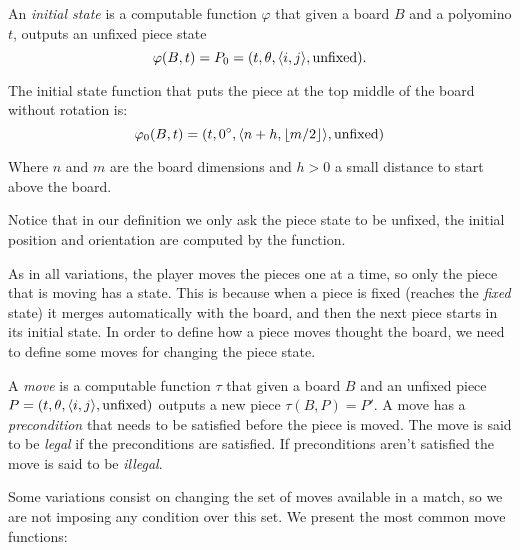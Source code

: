 \begin{definition} 
  An \emph{initial state} is a computable function $\varphi$ that given a board $B$ and a polyomino $t$, outputs an unfixed piece state $$\varphi(B,t) = P_0 = \piece[t][\theta][i][j][\text{unfixed}].$$
\end{definition}

\begin{example} The initial state function that puts the piece at the top middle of the board without rotation is:
$$\varphi_0(B,t) = \piece[t][0^\circ][n + h][\lfloor m / 2 \rfloor][\text{unfixed}]$$

Where $n$ and $m$ are the board dimensions and $h > 0$ a small distance to start above the board.

\end{example}


Notice that in our definition we only ask the piece state to be unfixed, the initial position and orientation are computed by the function. 

\vspace{10px}

As in all variations, the player moves the pieces one at a time, so only the piece that is moving has a state. This is because when a piece is fixed (reaches the \emph{fixed} state) it merges automatically with the board, and then the next piece starts in its initial state. In order to define how a piece moves thought the board, we need to define some moves for changing the piece state. 

\begin{definition} 
  A \emph{move} is a computable function $\tau$ that given a board $B$ and an unfixed piece $P = \piece[t][\theta][i][j][\text{unfixed}]$ outputs a new piece $\tau(B, P) = P'$. A move has a \emph{precondition} that needs to be satisfied before the piece is moved. The move is said to be \emph{legal} if the preconditions are satisfied. If preconditions aren't satisfied the move is said to be \emph{illegal}.
\end{definition}

Some variations consist on changing the set of  moves available in a match, so we are not imposing any condition over this set. We present the most common move functions:

